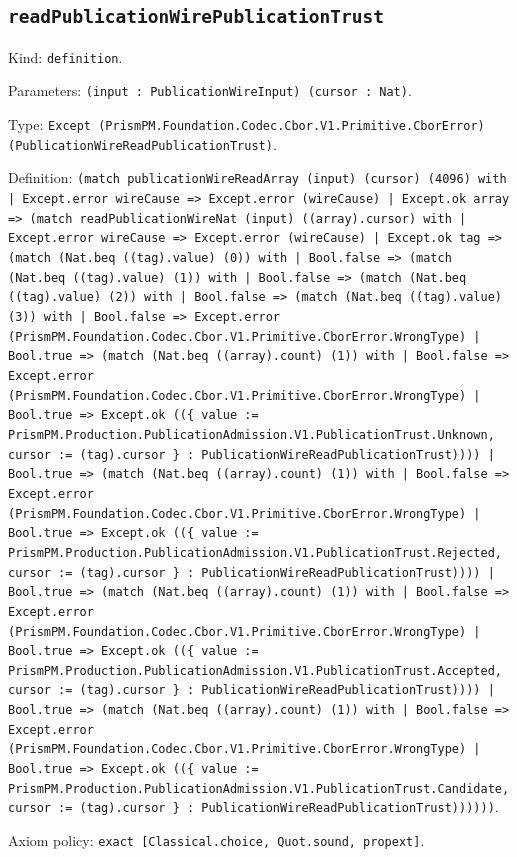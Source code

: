 \documentclass[11pt]{article}
\begin{document}
\subsection*{\texttt{readPublicationWirePublicationTrust}}
\noindent Kind: \texttt{definition}.\par
\noindent Parameters: \texttt{(input : PublicationWireInput) (cursor : Nat)}.\par
\noindent Type: \texttt{Except (PrismPM.Foundation.Codec.Cbor.V1.Primitive.CborError) (PublicationWireReadPublicationTrust)}.\par
\noindent Definition: \texttt{(match publicationWireReadArray (input) (cursor) (4096) with | Except.error wireCause => Except.error (wireCause) | Except.ok array => (match readPublicationWireNat (input) ((array).cursor) with | Except.error wireCause => Except.error (wireCause) | Except.ok tag => (match (Nat.beq ((tag).value) (0)) with | Bool.false => (match (Nat.beq ((tag).value) (1)) with | Bool.false => (match (Nat.beq ((tag).value) (2)) with | Bool.false => (match (Nat.beq ((tag).value) (3)) with | Bool.false => Except.error (PrismPM.Foundation.Codec.Cbor.V1.Primitive.CborError.WrongType) | Bool.true => (match (Nat.beq ((array).count) (1)) with | Bool.false => Except.error (PrismPM.Foundation.Codec.Cbor.V1.Primitive.CborError.WrongType) | Bool.true => Except.ok ((\{ value := PrismPM.Production.PublicationAdmission.V1.PublicationTrust.Unknown, cursor := (tag).cursor \} : PublicationWireReadPublicationTrust)))) | Bool.true => (match (Nat.beq ((array).count) (1)) with | Bool.false => Except.error (PrismPM.Foundation.Codec.Cbor.V1.Primitive.CborError.WrongType) | Bool.true => Except.ok ((\{ value := PrismPM.Production.PublicationAdmission.V1.PublicationTrust.Rejected, cursor := (tag).cursor \} : PublicationWireReadPublicationTrust)))) | Bool.true => (match (Nat.beq ((array).count) (1)) with | Bool.false => Except.error (PrismPM.Foundation.Codec.Cbor.V1.Primitive.CborError.WrongType) | Bool.true => Except.ok ((\{ value := PrismPM.Production.PublicationAdmission.V1.PublicationTrust.Accepted, cursor := (tag).cursor \} : PublicationWireReadPublicationTrust)))) | Bool.true => (match (Nat.beq ((array).count) (1)) with | Bool.false => Except.error (PrismPM.Foundation.Codec.Cbor.V1.Primitive.CborError.WrongType) | Bool.true => Except.ok ((\{ value := PrismPM.Production.PublicationAdmission.V1.PublicationTrust.Candidate, cursor := (tag).cursor \} : PublicationWireReadPublicationTrust))))))}.\par
\noindent Axiom policy: \texttt{exact [Classical.choice, Quot.sound, propext]}.\par
\end{document}
